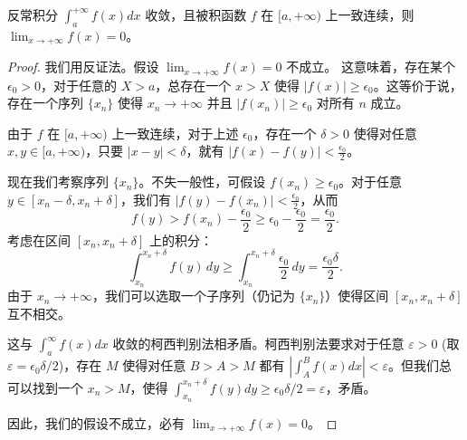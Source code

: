 \documentclass[lang=cn,10pt,thmcnt=section]{elegantbook}
\begin{document}
\begin{example}
    反常积分 \(\int_a^{+\infty} f(x) dx\) 收敛，且被积函数 \(f\) 在 \([a, +\infty)\) 上一致连续，则 \(\lim_{x \to +\infty} f(x) = 0\)。
\end{example}
\begin{proof}
    我们用反证法。假设 $\lim_{x \to +\infty} f(x) = 0$ 不成立。
    这意味着，存在某个 $\epsilon_0 > 0$，对于任意的 $X>a$，总存在一个 $x > X$ 使得 $|f(x)| \ge \epsilon_0$。这等价于说，存在一个序列 $\{x_n\}$ 使得 $x_n \to +\infty$ 并且 $|f(x_n)| \ge \epsilon_0$ 对所有 $n$ 成立。
    
    由于 $f$ 在 $[a, +\infty)$ 上一致连续，对于上述 $\epsilon_0$，存在一个 $\delta > 0$ 使得对任意 $x,y \in [a, +\infty)$，只要 $|x-y|<\delta$，就有 $|f(x)-f(y)| < \frac{\epsilon_0}{2}$。
    
    现在我们考察序列 $\{x_n\}$。不失一般性，可假设 $f(x_n) \ge \epsilon_0$。对于任意 $y \in [x_n - \delta, x_n + \delta]$，我们有 $|f(y) - f(x_n)| < \frac{\epsilon_0}{2}$，从而
    \[ f(y) > f(x_n) - \frac{\epsilon_0}{2} \ge \epsilon_0 - \frac{\epsilon_0}{2} = \frac{\epsilon_0}{2}. \]
    考虑在区间 $[x_n, x_n+\delta]$ 上的积分：
    \[ \int_{x_n}^{x_n+\delta} f(y) \, dy \ge \int_{x_n}^{x_n+\delta} \frac{\epsilon_0}{2} \, dy = \frac{\epsilon_0 \delta}{2}. \]
    由于 $x_n \to +\infty$，我们可以选取一个子序列（仍记为 $\{x_n\}$）使得区间 $[x_n, x_n+\delta]$ 互不相交。
    
    这与 $\int_a^\infty f(x)dx$ 收敛的柯西判别法相矛盾。柯西判别法要求对于任意 $\varepsilon > 0$ (取 $\varepsilon = \epsilon_0 \delta / 2$)，存在 $M$ 使得对任意 $B>A>M$ 都有 $|\int_A^B f(x)dx| < \varepsilon$。但我们总可以找到一个 $x_n > M$，使得 $\int_{x_n}^{x_n+\delta} f(y)dy \ge \epsilon_0 \delta / 2 = \varepsilon$，矛盾。
    
    因此，我们的假设不成立，必有 $\lim_{x \to +\infty} f(x) = 0$。
\end{proof}
\end{document}
